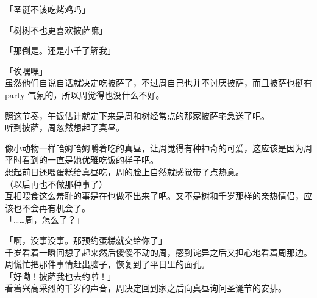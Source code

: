 「圣诞不该吃烤鸡吗」

「树树不也更喜欢披萨嘛」

「那倒是。还是小千了解我」

「诶嘿嘿」\\

虽然他们自说自话就决定吃披萨了，不过周自己也并不讨厌披萨，而且披萨也挺有 party 气氛的，所以周觉得也没什么不好。

照这节奏，午饭估计就定下来是周和树经常点的那家披萨宅急送了吧。\\

听到披萨，周忽然想起了真昼。

像小动物一样哈姆哈姆嚼着吃的真昼，让周觉得有种神奇的可爱，这应该是因为周平时看到的一直是她优雅吃饭的样子吧。\\

想起前日还喂蛋糕给真昼吃，周的脸上自然就感觉带了点热意。\\

（以后再也不做那种事了）\\

互相喂食这么羞耻的事是在也做不出来了吧。又不是树和千岁那样的亲热情侣，应该也不会再有机会了。\\

「……周，怎么了？」

「啊，没事没事。那预约蛋糕就交给你了」\\

千岁看着一瞬间想了起来然后傻傻不动的周，感到诧异之后又担心地看着周那边。周慌忙把那件事情赶出脑子，恢复到了平日里的面孔。\\

「好嘞！披萨我也去约啦！」\\

看着兴高采烈的千岁的声音，周决定回到家之后向真昼询问圣诞节的安排。\\
